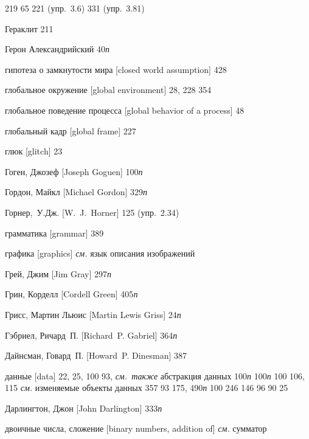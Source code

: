 \begin{theindex}
   219
   65
   221 (упр.~3.6)
   331 (упр.~3.81)
\item {Гераклит} 211
\item {Герон Александрийский} 40{\it п}
\item {гипотеза о замкнутости мира [closed world assumption]} 428
\item {глобальное окружение [global environment]} 28, 228
   354
\item {глобальное поведение процесса [global behavior of a process]} 48
\item {глобальный кадр [global frame]} 227
\item {глюк [glitch]} 23
\item {Гоген, Джозеф [Joseph Goguen]} 100{\it п}
\item {Гордон, Майкл [Michael Gordon]} 329{\it п}
\item {Горнер,~У.Дж. [W.~J.~Horner]} 125 (упр.~2.34)
\item {грамматика [grammar]} 389
\item {графика [graphics]} {\it см.} язык описания изображений
\item {Грей, Джим [Jim Gray]} 297{\it п}
\item {Грин, Корделл [Cordell Green]} 405{\it п}
\item {Грисс, Мартин Льюис [Martin Lewis Griss]} 24{\it п}
\item {Гэбриел, Ричард~П. [Richard~P. Gabriel]} 364{\it п}
\bigskip
\item {Дайнсман, Говард~П. [Howard~P. Dinesman]} 387
\item {данные [data]} 22, 25, 100
   93, {\it см.~также} абстракция данных
   100{\it п}
   100{\it п}
   100
   106, 115
   {\it см.} изменяемые объекты данных
   357
   93
   175, 490{\it п}
   100
   246
   146
   96
   90
   25
\item {Дарлингтон, Джон [John Darlington]} 333{\it п}
\item {двоичные числа, сложение [binary numbers, addition of]} {\it см.} сумматор

\end{theindex}
